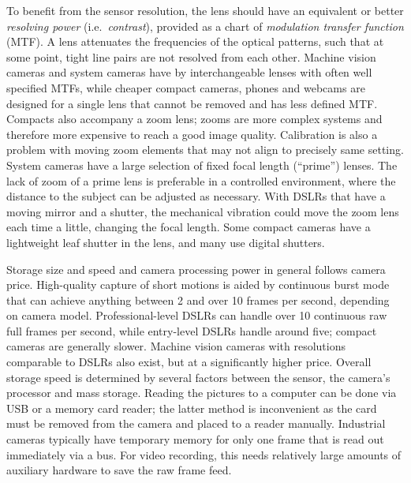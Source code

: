 
To benefit from the sensor resolution, the lens should have an equivalent or better \emph{resolving power} (i.e.\ \emph{contrast}), provided as a chart of \emph{modulation transfer function} (MTF).
A lens attenuates the frequencies of the optical patterns, such that at some point, tight line pairs are not resolved from each other.
Machine vision cameras and system cameras have by interchangeable lenses with often well specified MTFs, while cheaper compact cameras, phones and webcams are designed for a single lens that cannot be removed and has less defined MTF.
Compacts also accompany a zoom lens; zooms are more complex systems and therefore more expensive to reach a good image quality.
Calibration is also a problem with moving zoom elements that may not align to precisely same setting.
System cameras have a large selection of fixed focal length (``prime'') lenses.
The lack of zoom of a prime lens is preferable in a controlled environment, where the distance to the subject can be adjusted as necessary.
With DSLRs that have a moving mirror and a shutter, the mechanical vibration could move the zoom lens each time a little, changing the focal length.
Some compact cameras have a lightweight leaf shutter in the lens, and many use digital shutters.




Storage size and speed and camera processing power in general follows camera price.
High-quality capture of short motions is aided by continuous burst mode that can achieve anything between 2 and over 10 frames per second, depending on camera model.
Professional-level DSLRs can handle over 10 continuous raw full frames per second, while entry-level DSLRs handle around five;
compact cameras are generally slower.
Machine vision cameras with resolutions comparable to DSLRs also exist, but at a significantly higher price.
Overall storage speed is determined by several factors between the sensor, the camera's processor and mass storage.
Reading the pictures to a computer can be done via USB or a memory card reader; the latter method is inconvenient as the card must be removed from the camera and placed to a reader manually.
Industrial cameras typically have temporary memory for only one frame that is read out immediately via a bus.
For video recording, this needs relatively large amounts of auxiliary hardware to save the raw frame feed.

